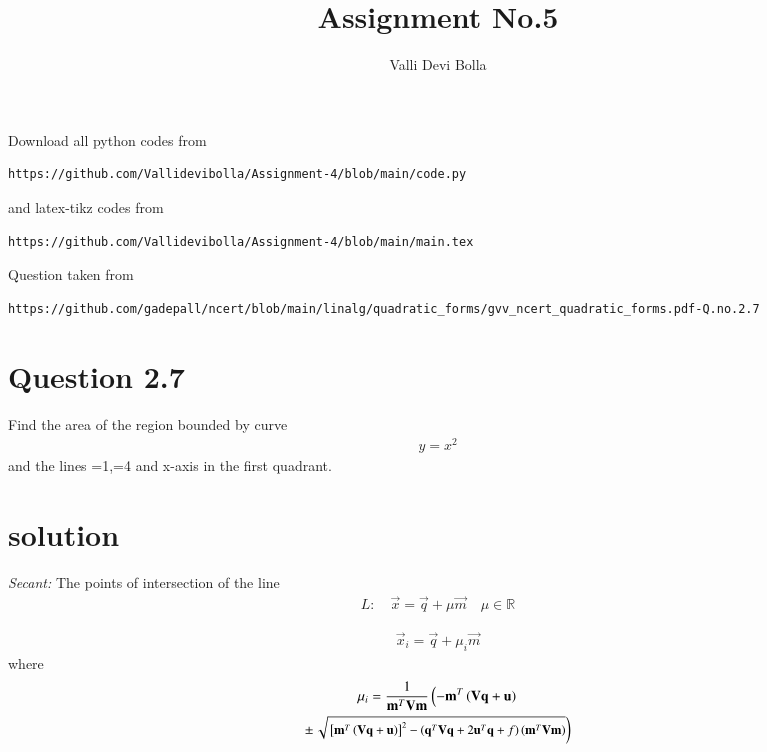 \documentclass[journal,12pt,twocolumn]{IEEEtran}
\begin{document}
\def\rightbox#1{\makebox[0in][r]{#1}}
\def\centbox#1{\makebox[0in]{#1}}
\def\topbox#1{\raisebox{-\baselineskip}[0in][0in]{#1}}
\def\midbox#1{\raisebox{-0.5\baselineskip}[0in][0in]{#1}}
\vspace{3cm}
\title{Assignment No.5}
\author{Valli Devi Bolla}
\maketitle
\newpage
\bigskip
\renewcommand{\thefigure}{\theenumi}
\renewcommand{\thetable}{\theenumi}
Download all python codes from
\begin{lstlisting}
https://github.com/Vallidevibolla/Assignment-4/blob/main/code.py
\end{lstlisting}
%
and latex-tikz codes from
%
\begin{lstlisting}
https://github.com/Vallidevibolla/Assignment-4/blob/main/main.tex
\end{lstlisting}
%
Question taken from
\begin{lstlisting}
https://github.com/gadepall/ncert/blob/main/linalg/quadratic_forms/gvv_ncert_quadratic_forms.pdf-Q.no.2.7
\end{lstlisting}
%
%
\section{Question 2.7}
Find the area of the region bounded by curve 
\begin{align}
y = x^2
\label{eq:parab}
\end{align}
and the lines =1,=4 and x-axis in the first quadrant.
\\
\section{solution}

\item 
{\em Secant: }The points of intersection of the line 
\begin{align}
L: \quad \vec{x} = \vec{q} + \mu \vec{m} \quad \mu \in \mathbb{R}
\label{eq:conic_tangent}
\end{align}

\begin{align}\label{eq:parametricform}
\vec{x}_i = \vec{q} + \mu_i \vec{m}
\end{align}
%
where
\begin{multline}
\mu_i = \frac{1}
{
\mathbf{m}^T\mathbf{V}\mathbf{m}
}
\left(-\mathbf{m}^T\left(\mathbf{V}\mathbf{q}+\mathbf{u}\right)\right.
\\
\pm
{\small
\ensuremath{\left.\sqrt{
{}\left[
\mathbf{m}^T\left(\mathbf{V}\mathbf{q}+\mathbf{u}\right)
\right]^2
-
\left(
\mathbf{q}^T\mathbf{V}\mathbf{q} + 2\mathbf{u}^T\mathbf{q} +f
\right)
\left(\mathbf{m}^T\mathbf{V}\mathbf{m}\right)
}
\right)}
}
\label{eq:tangent_roots}
\end{multline}
                    
\end{document}
